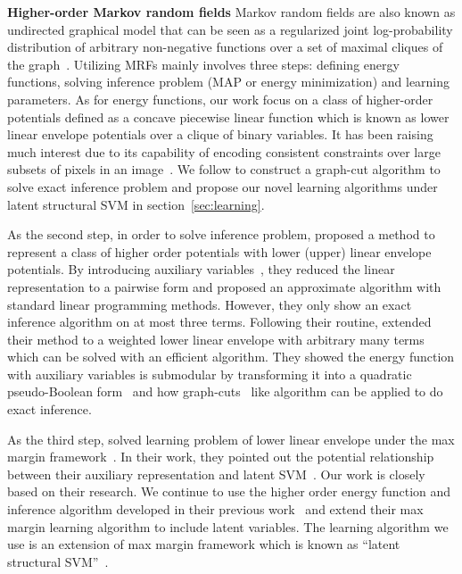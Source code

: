 \documentclass[sigconf]{acmart}
\renewcommand{\citename}{\citet}
\renewcommand{\cite}{\citep}
\begin{document}
\textbf{Higher-order Markov random fields} Markov random
  fields are also known as undirected graphical model
that can be seen as a regularized joint log-probability
distribution of arbitrary non-negative functions over a set of
maximal cliques of the graph~\cite{bishop:2006:PRML}. Utilizing
MRFs mainly involves three steps: defining energy
  functions, solving inference problem (MAP or energy
minimization) and learning parameters. As for energy
  functions, our work focus on a class of higher-order
potentials defined as a concave piecewise linear function which
is known as lower linear envelope potentials over a clique
of binary variables. It has been raising much interest due to its
capability of encoding consistent constraints over large subsets
of pixels in an image~\cite{Kohli:CVPR07,Nowozin:2011}. We follow
\citename{gouldlearning} to construct a graph-cut algorithm to
solve exact inference problem and propose our novel learning
algorithms under latent structural SVM in
section~\ref{sec:learning}.

As the second step, in order to solve inference problem,
\citename{kohli2009robust} proposed a method to represent a class
of higher order potentials with lower (upper) linear envelope
potentials. By introducing auxiliary
variables~\cite{Kohli:CVPR10}, they reduced the linear
representation to a pairwise form and proposed an approximate
algorithm with standard linear programming methods. However, they
only show an exact inference algorithm on at most three terms.
Following their routine, \citename{gouldlearning} extended their
method to a weighted lower linear envelope with arbitrary many
terms which can be solved with an efficient algorithm. They
showed the energy function with auxiliary variables is submodular
by transforming it into a quadratic pseudo-Boolean
form~\cite{Boros:MATH02} and how
graph-cuts~\cite{Hammer:1965, Boykov:ICCV01,
  Freedman:CVPR05} like algorithm can be applied to do exact
inference.

As the third step, \citename{gouldlearning} solved
learning problem of lower linear envelope under the max
margin framework~\cite{tsochantaridis2005large}. In their work, 
they pointed out the potential relationship between their
auxiliary representation and latent SVM~\cite{yu2009learning}.
Our work is closely based on their research. We continue to use
the higher order energy function and inference algorithm
developed in their previous work~\cite{Gould:ICML2011} and extend
their max margin learning algorithm to include latent variables.
The learning algorithm we use is an extension of max margin
framework which is known as ``latent structural
SVM''~\cite{yu2009learning}.
\end{document}
